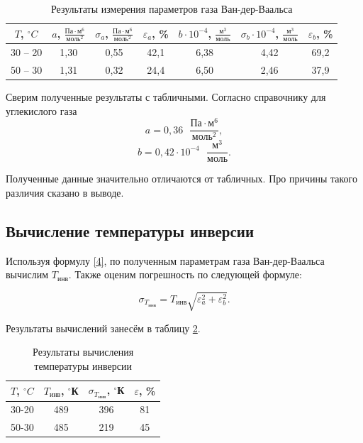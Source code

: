\documentclass[a4paper,12pt]{article} %
\begin{document}
\begin{table}[H]
	\centering
	\begin{tabular}{|c|c|c|c|c|c|c|}
		\hline
		$ T $, $ ^\circ C $ & $ a $, $\displaystyle \frac{\text{Па}\cdot\text{м}^6}{\text{моль}^2} $ &$ \sigma_a $, $\displaystyle \frac{\text{Па}\cdot\text{м}^6}{\text{моль}^2} $ & $ \varepsilon_a $, \% & $ b\cdot10^{-4} $, $ \displaystyle\frac{\text{м}^3}{\text{моль}} $ & $ \sigma_b \cdot 10^{-4} $, $\displaystyle \frac{\text{м}^3}{\text{моль}} $ & $ \varepsilon_b $, \% \\ \hline
		30 -- 20 & 1,30 & 0,55 & 42,1 & 6,38 & 4,42 & 69,2 \\ \hline
		50 -- 30 & 1,31 & 0,32 & 24,4 & 6,50 & 2,46 & 37,9 \\ \hline
	\end{tabular}
	\caption{Результаты измерения параметров газа Ван-дер-Ваальса}
	\label{tab:a-b}
\end{table}

Сверим полученные результаты с табличными. Согласно справочнику для углекислого газа \[ a = 0,36 \text{ } \frac{\text{Па}\cdot\text{м}^6}{\text{моль}^2}, \] \[ b = 0,42\cdot 10^{-4} \text{ }\frac{\text{м}^3}{\text{моль}}. \]

Полученные данные значительно отличаются от табличных. Про причины такого различия сказано в выводе.

\subsection{Вычисление температуры инверсии}

Используя формулу \eqref{4}, по полученным параметрам газа Ван-дер-Ваальса вычислим $ T_\text{инв} $. Также оценим погрешность по следующей формуле:

\[ \sigma_{T_\text{инв}} = T_\text{инв}\sqrt{\varepsilon^2_a+\varepsilon_b^2}. \]

Результаты вычислений занесём в таблицу \ref{tab:temp}.

\begin{table}[H]
	\centering
	\begin{tabular}{|c|c|c|c|}
		\hline
		$ T $, $ ^\circ C $ & $ T_\text{инв} $, $ ^\circ $К & $ \sigma_{T_\text{инв}} $, $ ^\circ $К & $ \varepsilon $, \% \\ \hline
		30-20 & 489 & 396 & 81 \\ \hline
		50-30 & 485 & 219 & 45 \\ \hline
	\end{tabular}
	\caption{Результаты вычисления температуры инверсии}
	\label{tab:temp}
\end{table}
\end{document}
